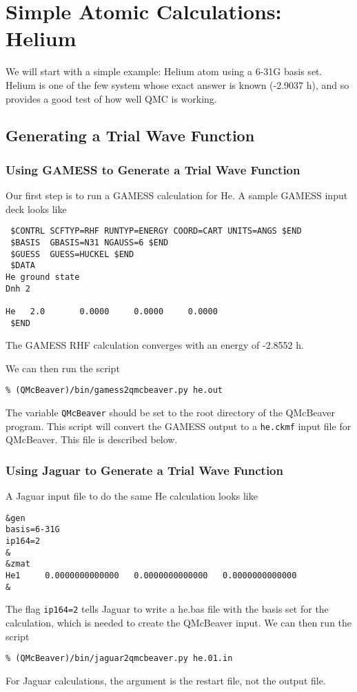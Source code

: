 \documentclass[11pt]{article}
\begin{document}
\section{Simple Atomic Calculations: Helium}
We will start with a simple example: Helium atom using a 6-31G basis
set. Helium is one of the few system whose exact answer is known
(-2.9037 h), and so provides a good test of how well QMC is working.
\subsection{Generating a Trial Wave Function}
\subsubsection{Using GAMESS to Generate a Trial Wave Function}
Our first step is to run a GAMESS calculation for He. A sample GAMESS
input deck looks like
\begin{verbatim}
 $CONTRL SCFTYP=RHF RUNTYP=ENERGY COORD=CART UNITS=ANGS $END
 $BASIS  GBASIS=N31 NGAUSS=6 $END
 $GUESS  GUESS=HUCKEL $END
 $DATA
He ground state
Dnh 2

He   2.0       0.0000     0.0000     0.0000 
 $END
\end{verbatim}
The GAMESS RHF calculation converges with an energy of -2.8552 h.

We can then run the script 
\begin{verbatim}
% (QMcBeaver)/bin/gamess2qmcbeaver.py he.out
\end{verbatim}
The variable \verb-QMcBeaver- should be set to the root 
directory of the QMcBeaver program.  This script will convert the GAMESS
output to a \verb-he.ckmf- input file for QMcBeaver. This file is
described below. 

\subsubsection{Using Jaguar to Generate a Trial Wave Function}
A Jaguar input file to do the same He calculation looks like
\begin{verbatim}
&gen
basis=6-31G
ip164=2
&
&zmat
He1     0.0000000000000   0.0000000000000   0.0000000000000
&
\end{verbatim}

The flag \verb-ip164=2- tells Jaguar to write a he.bas file with the
basis set for the calculation, which is needed to create the QMcBeaver
input.  We can then run the script
\begin{verbatim}
% (QMcBeaver)/bin/jaguar2qmcbeaver.py he.01.in
\end{verbatim}
For Jaguar calculations, the argument is the restart file, not the
output file.
\end{document}
